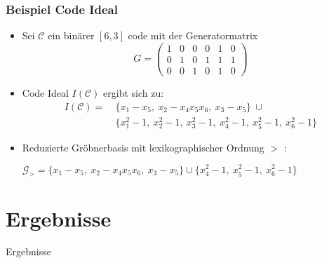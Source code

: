 \documentclass{beamer}
\begin{document}
\begin{frame}[<+->]
\frametitle{Beispiel Code Ideal}
\begin{itemize}
\item 
Sei $\mathcal{C}$ ein binärer $[6,3]$ code mit der Generatormatrix
\[
G =
\begin{pmatrix}
1 & 0 & 0 & 0 & 1 & 0 \\ 
0 & 1 & 0 & 1 & 1 & 1 \\  
0 & 0 & 1 & 0 & 1 & 0  
\end{pmatrix} 
\]

\item Code Ideal $I(\mathcal{C})$ ergibt sich zu: 
\begin{align*}
I(\mathcal{C}) = &~\{x_{1}-x_{5},~x_{2}-x_{4}x_{5}x_{6},~x_{3}-x_{5}  \} ~\cup \\ &~\{x_{1}^{2}-1,~x_{2}^{2}-1,~x_{3}^{2}-1,~x_{4}^{2}-1,~x_{5}^{2}-1,~x_{6}^{2}-1\}
\end{align*}
\item Reduzierte Gröbnerbasis mit lexikographischer Ordnung $>$ :
\begin{center}
$ \mathcal{G}_{>} = \{x_{1}-x_{5},~x_{2}-x_{4}x_{5}x_{6},~x_{3}-x_{5}  \} \cup \{x_{4}^{2}-1,~x_{5}^{2}-1,~x_{6}^{2}-1  \}  $
\end{center} 

\end{itemize}
\end{frame}

\section{Ergebnisse}

\begin{frame}

\centerline{Ergebnisse}


\end{frame}
\end{document}
